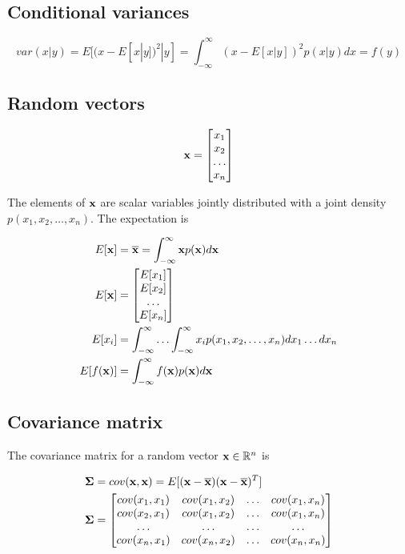 \subsection{Conditional variances}

\begin{equation*}
  var(x|y) = E[(x - E[x|y])^2|y] = \int_{-\infty}^\infty (x - E[x|y])^2 p(x|y)
    dx = f(y)
\end{equation*}

\subsection{Random vectors}

\begin{equation*}
  \mathbf{x} = \begin{bmatrix}
    x_1 \\
    x_2 \\
    \ldots \\
    x_n
  \end{bmatrix}
\end{equation*}

The elements of $\mathbf{x}$ are scalar variables jointly distributed with a joint
density $p(x_1, x_2, \ldots, x_n)$. The expectation is

\begin{align*}
  E[\mathbf{x}] &= \overline{\mathbf{x}} = \int_{-\infty}^\infty \mathbf{x} p(\mathbf{x}) d\mathbf{x}
    \\
  E[\mathbf{x}] &= \begin{bmatrix}
    E[x_1] \\
    E[x_2] \\
    \ldots \\
    E[x_n]
  \end{bmatrix} \\
  E[x_i] &= \int_{-\infty}^\infty \ldots \int_{-\infty}^\infty x_i
    p(x_1, x_2, \ldots, x_n) dx_1 \ldots dx_n \\
  E[f(\mathbf{x})] &= \int_{-\infty}^\infty f(\mathbf{x}) p(\mathbf{x}) d\mathbf{x}
\end{align*}

\subsection{Covariance matrix}

The covariance matrix for a random vector $\mathbf{x} \in \mathbb{R}^n$ is

\begin{align*}
  \mathbf{\Sigma} &= cov(\mathbf{x}, \mathbf{x}) = E[(\mathbf{x} - \overline{\mathbf{x}})
    (\mathbf{x} - \overline{\mathbf{x}})^T] \\
  \mathbf{\Sigma} &= \begin{bmatrix}
    cov(x_1, x_1) & cov(x_1, x_2) & \ldots & cov(x_1, x_n) \\
    cov(x_2, x_1) & cov(x_1, x_2) & \ldots & cov(x_1, x_n) \\
    \ldots        & \ldots        & \ldots & \ldots \\
    cov(x_n, x_1) & cov(x_n, x_2) & \ldots & cov(x_n, x_n) \\
  \end{bmatrix}
\end{align*}

